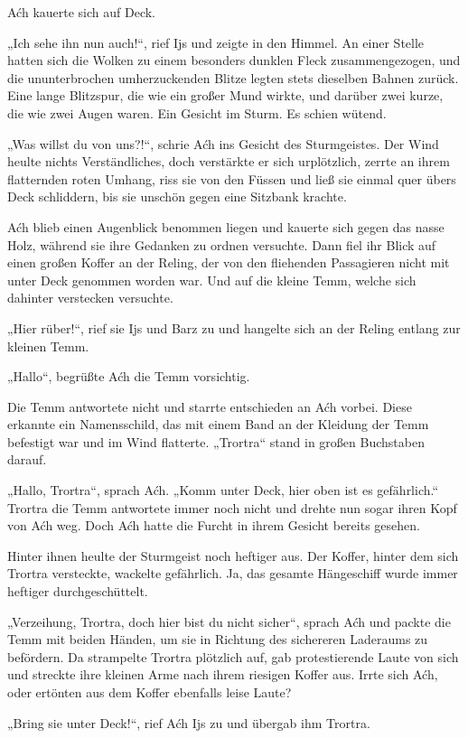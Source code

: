 Aćh kauerte sich auf Deck.

„Ich sehe ihn nun auch!“, rief Ijs und zeigte in den Himmel. An einer Stelle hatten sich die Wolken zu einem besonders dunklen Fleck zusammengezogen, und die ununterbrochen umherzuckenden Blitze legten stets dieselben Bahnen zurück. Eine lange Blitzspur, die wie ein großer Mund wirkte, und darüber zwei kurze, die wie zwei Augen waren. Ein Gesicht im Sturm. Es schien wütend.

„Was willst du von uns?!“, schrie Aćh ins Gesicht des Sturmgeistes. Der Wind heulte nichts Verständliches, doch verstärkte er sich urplötzlich, zerrte an ihrem flatternden roten Umhang, riss sie von den Füssen und ließ sie einmal quer übers Deck schliddern, bis sie unschön gegen eine Sitzbank krachte.

Aćh blieb einen Augenblick benommen liegen und kauerte sich gegen das nasse Holz, während sie ihre Gedanken zu ordnen versuchte. Dann fiel ihr Blick auf einen großen Koffer an der Reling, der von den fliehenden Passagieren nicht mit unter Deck genommen worden war. Und auf die kleine Temm, welche sich dahinter verstecken versuchte.

„Hier rüber!“, rief sie Ijs und Barz zu und hangelte sich an der Reling entlang zur kleinen Temm.

„Hallo“, begrüßte Aćh die Temm vorsichtig.

Die Temm antwortete nicht und starrte entschieden an Aćh vorbei. Diese erkannte ein Namensschild, das mit einem Band an der Kleidung der Temm befestigt war und im Wind flatterte. „Trortra“ stand in großen Buchstaben darauf.

„Hallo, Trortra“, sprach Aćh. „Komm unter Deck, hier oben ist es gefährlich.“ Trortra die Temm antwortete immer noch nicht und drehte nun sogar ihren Kopf von Aćh weg. Doch Aćh hatte die Furcht in ihrem Gesicht bereits gesehen.

Hinter ihnen heulte der Sturmgeist noch heftiger aus. Der Koffer, hinter dem sich Trortra versteckte, wackelte gefährlich. Ja, das gesamte Hängeschiff wurde immer heftiger durchgeschüttelt.

„Verzeihung, Trortra, doch hier bist du nicht sicher“, sprach Aćh und packte die Temm mit beiden Händen, um sie in Richtung des sichereren Laderaums zu befördern. Da strampelte Trortra plötzlich auf, gab protestierende Laute von sich und streckte ihre kleinen Arme nach ihrem riesigen Koffer aus. Irrte sich Aćh, oder ertönten aus dem Koffer ebenfalls leise Laute?

„Bring sie unter Deck!“, rief Aćh Ijs zu und übergab ihm Trortra.

